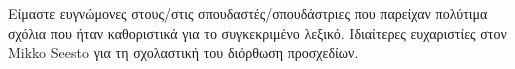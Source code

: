 \documentclass[journal,12pt,onecolumn]{article}
\begin{document}
\noindent \foreignlanguage{greek}{Είμαστε ευγνώμονες στους/στις σπουδαστές/σπουδάστριες που παρείχαν 
πολύτιμα σχόλια που ήταν καθοριστικά για το συγκεκριμένο λεξικό. Ιδιαίτερες ευχαριστίες στον} Mikko 
Seesto \foreignlanguage{greek}{για τη σχολαστική του διόρθωση προσχεδίων}.



\newpage 


\newpage

\glsaddallunused



\printglossary[title={Machine Learning Concepts}, nonumberlist]

\printglossary[type=systems, title={Machine Learning Systems}, nonumberlist]


\newpage
{}
\pagestyle{empty}  %
\printindex  %




\newpage


\end{document}
